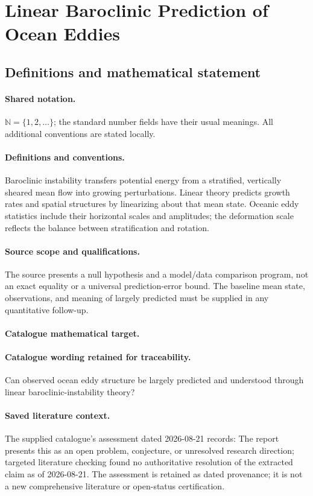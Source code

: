 \documentclass[11pt]{article}
\begin{document}
\section{Linear Baroclinic Prediction of Ocean Eddies}\label{statement}

\subsection{Definitions and mathematical statement}

\paragraph{Shared notation.}$\mathbb N=\{1,2,\ldots\}$; the standard number fields have their usual meanings. All additional conventions are stated locally.


\paragraph{Definitions and conventions.} Baroclinic instability transfers potential energy from a stratified, vertically sheared mean flow into growing perturbations. Linear theory predicts growth rates and spatial structures by linearizing about that mean state. Oceanic eddy statistics include their horizontal scales and amplitudes; the deformation scale reflects the balance between stratification and rotation.

\paragraph{Source scope and qualifications.} The source presents a null hypothesis and a model/data comparison program, not an exact equality or a universal prediction-error bound. The baseline mean state, observations, and meaning of largely predicted must be supplied in any quantitative follow-up.

\paragraph{Catalogue mathematical target.}
\paragraph{Catalogue wording retained for traceability.}
Can observed ocean eddy structure be largely predicted and understood through linear baroclinic-instability theory?

\paragraph{Saved literature context.} The supplied catalogue's assessment dated 2026-08-21 records: The report presents this as an open problem, conjecture, or unresolved research direction; targeted literature checking found no authoritative resolution of the extracted claim as of 2026-08-21. The assessment is retained as dated provenance; it is not a new comprehensive literature or open-status certification.
\end{document}
